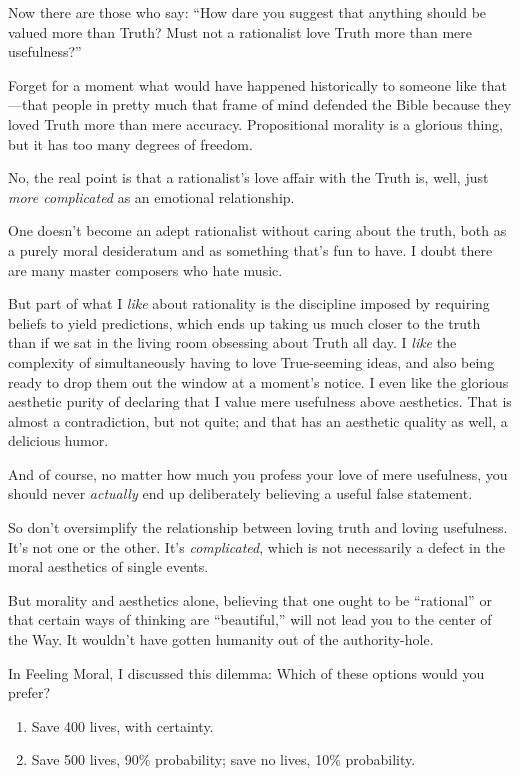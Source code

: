  Now there are those who say: ``How dare you
suggest that anything should be valued more than Truth? Must not a
rationalist love Truth more than mere usefulness?''


 Forget for a moment what would have happened historically to
someone like that---that people in pretty much that frame of mind
defended the Bible because they loved Truth more than mere accuracy.
Propositional morality is a glorious thing, but it has too many degrees
of freedom.


 No, the real point is that a rationalist's love
affair with the Truth is, well, just \textit{more complicated} as an
emotional relationship.


 One doesn't become an adept rationalist without
caring about the truth, both as a purely moral desideratum and as
something that's fun to have. I doubt there are many
master composers who hate music.


 But part of what I \textit{like} about rationality is the
discipline imposed by requiring beliefs to yield predictions, which
ends up taking us much closer to the truth than if we sat in the living
room obsessing about Truth all day. I \textit{like} the complexity of
simultaneously having to love True-seeming ideas, and also being ready
to drop them out the window at a moment's notice. I
even like the glorious aesthetic purity of declaring that I value mere
usefulness above aesthetics. That is almost a contradiction, but not
quite; and that has an aesthetic quality as well, a delicious humor.


 And of course, no matter how much you profess your love of mere
usefulness, you should never \textit{actually} end up deliberately
believing a useful false statement.


 So don't oversimplify the relationship between
loving truth and loving usefulness. It's not one or the
other. It's \textit{complicated}, which is not
necessarily a defect in the moral aesthetics of single events.


 But morality and aesthetics alone, believing that one ought to be
``rational'' or that certain ways of
thinking are ``beautiful,'' will not
lead you to the center of the Way. It wouldn't have
gotten humanity out of the authority-hole.


 In Feeling Moral, I discussed this dilemma: Which of these options
would you prefer?

\begin{enumerate}
\item {
 Save 400 lives, with certainty.}

\item {
 Save 500 lives, 90\% probability; save no lives, 10\%
 probability.}
\end{enumerate}


